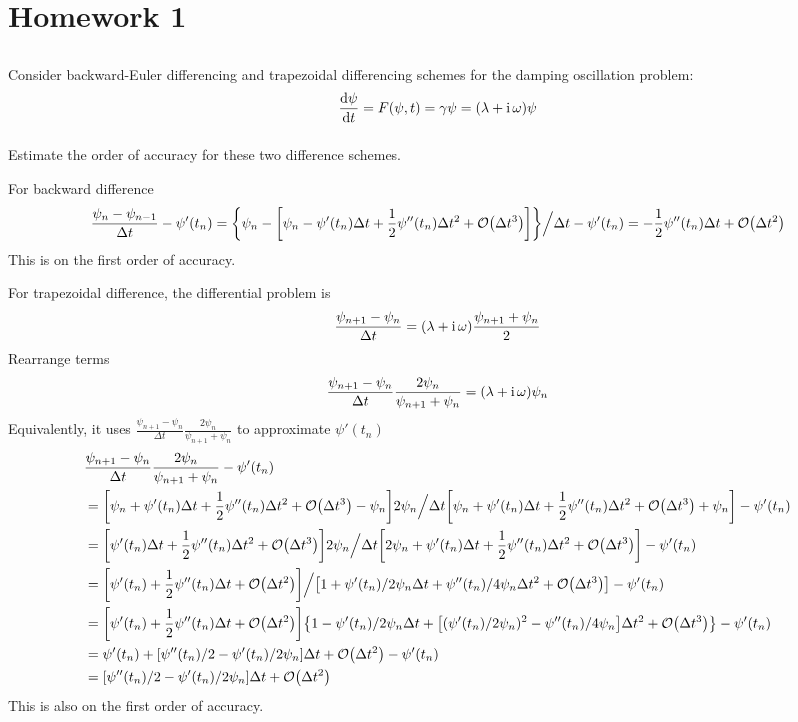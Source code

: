 \chapter{Homework 1}
\section{}
Consider backward-Euler differencing and trapezoidal differencing schemes for the damping oscillation problem:
\[ \dv{\psi}{t} = F(\psi, t) = \gamma\psi = (\lambda + \operatorname{\mathrm{i}}\omega)\psi \]

\subsection{}
Estimate the order of accuracy for these two difference schemes.

For backward difference
\[ \frac{\psi_n - \psi_{n-1}}{\Delta t} - \psi'(t_n) = \qty{\psi_n - \qty[\psi_n - \psi'(t_n)\Delta t + \frac12\psi''(t_n)\Delta t^2 + \order{\Delta t^3}]} \Big/ \Delta t - \psi'(t_n) = -\frac12\psi''(t_n)\Delta t + \order{\Delta t^2} \]
This is on the first order of accuracy.

For trapezoidal difference, the differential problem is
\[ \frac{\psi_{n+1}-\psi_n}{\Delta t} = (\lambda + \operatorname{\mathrm{i}}\omega)\frac{\psi_{n+1} + \psi_n}2 \]
Rearrange terms
\[ \frac{\psi_{n+1}-\psi_n}{\Delta t}\frac{2\psi_n}{\psi_{n+1} + \psi_n} = (\lambda + \operatorname{\mathrm{i}}\omega)\psi_n \]
Equivalently, it uses $\frac{\psi_{n+1} - \psi_n}{\Delta t}\frac{2\psi_n}{\psi_{n+1} + \psi_n}$ to approximate $\psi'(t_n)$
\begin{align*}
    &\frac{\psi_{n+1} - \psi_n}{\Delta t}\frac{2\psi_n}{\psi_{n+1} + \psi_n} - \psi'(t_n) \\
    &= \qty[\psi_n + \psi'(t_n)\Delta t + \frac12\psi''(t_n)\Delta t^2 + \order{\Delta t^3} - \psi_n] 2\psi_n \Big/ \Delta t \qty[\psi_n + \psi'(t_n)\Delta t + \frac12\psi''(t_n)\Delta t^2 + \order{\Delta t^3} + \psi_n] - \psi'(t_n) \\
    &= \qty[\psi'(t_n)\Delta t + \frac12\psi''(t_n)\Delta t^2 + \order{\Delta t^3}] 2\psi_n \Big/ \Delta t \qty[2\psi_n + \psi'(t_n)\Delta t + \frac12\psi''(t_n)\Delta t^2 + \order{\Delta t^3}] - \psi'(t_n) \\
    &= \qty[\psi'(t_n) + \frac12\psi''(t_n)\Delta t + \order{\Delta t^2}] \Big/ \qty[1 + \psi'(t_n)/2\psi_n\Delta t + \psi''(t_n)/4\psi_n\Delta t^2 + \order{\Delta t^3}] - \psi'(t_n) \\
    &= \qty[\psi'(t_n) + \frac12\psi''(t_n)\Delta t + \order{\Delta t^2}] \qty{1 - \psi'(t_n)/2\psi_n\Delta t + \qty[(\psi'(t_n)/2\psi_n)^2 - \psi''(t_n)/4\psi_n]\Delta t^2 + \order{\Delta t^3}} - \psi'(t_n) \\
    &= \psi'(t_n) + \qty[\psi''(t_n)/2-\psi'(t_n)/2\psi_n]\Delta t + \order{\Delta t^2}  - \psi'(t_n) \\
    &= \qty[\psi''(t_n)/2-\psi'(t_n)/2\psi_n]\Delta t + \order{\Delta t^2}
\end{align*}
This is also on the first order of accuracy.

